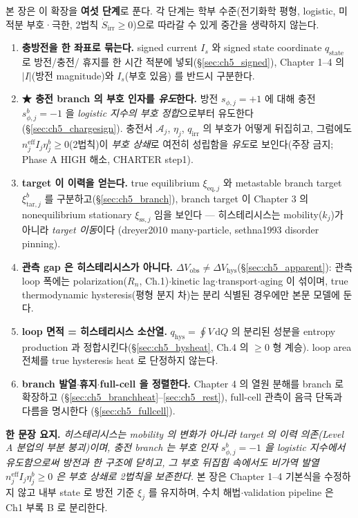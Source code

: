 \documentclass[11pt,a4paper]{article}
\newcommand{\dd}{\mathrm{d}}
\newcommand{\eff}{\mathrm{eff}}
\newcommand{\eq}{\mathrm{eq}}
\newcommand{\irr}{\mathrm{irr}}
\newcommand{\hys}{\mathrm{hys}}
\newcommand{\obs}{\mathrm{obs}}
\newcommand{\tar}{\mathrm{tar}}
\newcommand{\stt}{\mathrm{state}}
\newcommand{\sstat}{\mathrm{ss}}
\begin{document}
본 장은 이 확장을 \textbf{여섯 단계}로 푼다. 각 단계는 학부 수준(전기화학 평형, logistic, 미적분 부호·극한,
2법칙 $\dot S_\irr\ge0$)으로 따라갈 수 있게 중간을 생략하지 않는다.
\begin{enumerate}[label=\textbf{(\arabic*)},leftmargin=2.2em]
\item \textbf{충방전을 한 좌표로 묶는다.} signed current $I_s$ 와 signed state coordinate $q_\stt$ 로 방전/충전/
  휴지를 한 시간 적분에 넣되(\S\ref{sec:ch5_signed}), Chapter 1--4 의 $|I|$(방전 magnitude)와 $I_s$(부호 있음)
  를 반드시 구분한다.
\item \textbf{★ 충전 branch 의 부호 인자를 \emph{유도}한다.} 방전 $s_{\phi,j}=+1$ 에 대해 충전
  $s_{\phi,j}^b=-1$ 을 \emph{logistic 지수의 부호 정합}으로부터 유도한다(\S\ref{sec:ch5_chargesign}). 충전서
  $\mathcal A_j$, $\eta_j$, $q_\irr$ 의 부호가 어떻게 뒤집히고, 그럼에도 $n_j^{\eff}I_j\eta_j^b\ge0$(2법칙)이
  \emph{부호 상쇄}로 여전히 성립함을 \emph{유도}로 보인다(주장 금지; Phase A HIGH 해소, CHARTER step1).
\item \textbf{target 이 이력을 얻는다.} true equilibrium $\xi_{\eq,j}$ 와 metastable branch target
  $\xi_{\tar,j}^b$ 를 구분하고(\S\ref{sec:ch5_branch}), branch target 이 Chapter 3 의 nonequilibrium
  stationary $\xi_{\sstat,j}$ 임을 보인다 — 히스테리시스는 mobility($k_j$)가 아니라 \emph{target 이동}이다
  (dreyer2010 many-particle, sethna1993 disorder pinning).
\item \textbf{관측 gap 은 히스테리시스가 아니다.} $\Delta V_\obs\ne\Delta V_\hys$(\S\ref{sec:ch5_apparent}):
  관측 loop 폭에는 polarization($R_n$, Ch.1)$\cdot$kinetic lag$\cdot$transport$\cdot$aging 이 섞이며, true
  thermodynamic hysteresis(평형 분지 차)는 분리 식별된 경우에만 본문 모델에 둔다.
\item \textbf{loop 면적 = 히스테리시스 소산열.} $q_\hys=\oint V\,\dd Q$ 의 분리된 성분을 entropy production
  과 정합시킨다(\S\ref{sec:ch5_hysheat}, Ch.4 의 $\ge0$ 형 계승). loop area 전체를 true hysteresis heat 로
  단정하지 않는다.
\item \textbf{branch 발열$\cdot$휴지$\cdot$full-cell 을 정렬한다.} Chapter 4 의 열원 분해를 branch 로 확장하고
  (\S\ref{sec:ch5_branchheat}--\ref{sec:ch5_rest}), full-cell 관측이 음극 단독과 다름을 명시한다
  (\S\ref{sec:ch5_fullcell}).
\end{enumerate}

\noindent\textbf{한 문장 요지.} \emph{히스테리시스는 mobility 의 변화가 아니라 target 의 이력 의존(Level A
분업의 부분 붕괴)이며, 충전 branch 는 부호 인자 $s_{\phi,j}^b=-1$ 을 logistic 지수에서 \emph{유도}함으로써
방전과 한 구조에 닫히고, 그 부호 뒤집힘 속에서도 비가역 발열 $n_j^{\eff}I_j\eta_j^b\ge0$ 은 부호 상쇄로
2법칙을 보존한다.} 본 장은 Chapter 1--4 기본식을 수정하지 않고 내부 state 로 방전 기준 $\xi_j$ 를 유지하며,
수치 해법$\cdot$validation pipeline 은 Ch1 부록 B 로 분리한다.
\end{document}
